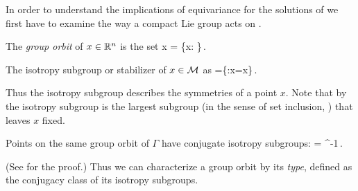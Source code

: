 In order to understand the implications of equivariance for the solutions
of  we first have to examine the way a compact
Lie group acts on .

 The \emph{group orbit} of $x\in\mathbb{R}^{n}$ is the set
\beq
	\Gamma x = \{\gamma x: \gamma\in\Gamma\}\,.
\eeq



\begin{definition}
\label{def:stab}
The isotropy subgroup or stabilizer of $x\in\mathcal{M}$ as
\beq
	=\{\gamma\in\Gamma:\gamma x=x\}\,.
\eeq
\end{definition}
Thus the isotropy subgroup describes the symmetries of a point $x$. Note that by
 the isotropy subgroup is the largest subgroup (in the
sense of set inclusion, \cf {}) that leaves $x$ fixed.


\addtocounter{definition}{1}

\begin{lemma}
\label{lem:stabGorbit}
Points on the same group orbit of $\Gamma$ have conjugate isotropy subgroups:
\beq
	=\gamma {} \gamma^{-1}\,.
\eeq
\end{lemma}
(See  for the proof.)
%
Thus we can characterize a group orbit by its \emph{type}, defined
as the conjugacy class of its isotropy subgroups.

